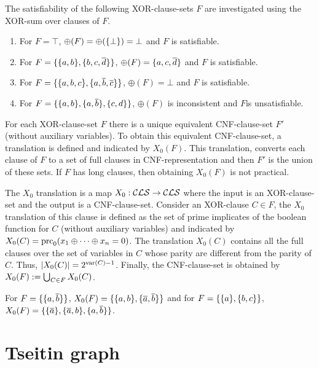 \documentclass{report}
\begin{document}
\begin{examp}\label{exp:xorcls}
The satisfiability of the following XOR-clause-sets $F$ are investigated using the XOR-sum over clauses of $F$.
  \begin{enumerate}
  \item For $F=\top$, $ \oplus(F)= \oplus(\{ \bot \})=\bot$ and $F$ is satisfiable.
  \item For $F=\{ \{ a,b \},\{ b,c,\overline d \} \}$, $ \oplus(F) = \{ a,c,\overline d \}$ and $F$ is satisfiable.
  \item For $F=\{ \{ a,b,c \},\{ a, \overline b, \overline c \} \}$, $ \oplus(F) = \bot$ and $F$ is satisfiable.  
  \item  For $F=\{ \{ a,b \},\{ a, \overline b \},\{ c,d \} \}$, $\oplus (F)$ is inconsistent and $F$is unsatisfiable.
  \end{enumerate}
\end{examp}

For each XOR-clause-set $F$ there is a unique equivalent CNF-clause-set $F'$ (without auxiliary variables). To obtain this equivalent CNF-clause-set, a translation is defined and indicated by $X_0(F)$. This translation, converts each clause of $F$ to a set of full clauses in CNF-representation and then $F'$ is the union of these sets. If $F$ has long clauses, then obtaining $X_0(F)$ is not practical.

\begin{defi}\label{def:x0tr}
\cite{h8} The $X_0$ translation is a map $X_0: \mathcal{CLS} \rightarrow \mathcal{CLS}$ where the input is an XOR-clause-set and the output is a  CNF-clause-set. Consider an XOR-clause $C \in F$, the $X_0$ translation of this clause is defined as the set of prime implicates of the boolean function for $C$ (without auxiliary variables) and indicated by $X_0(C)=\operatorname{prc}_0(x_1 \oplus \dots \oplus x_n = 0)$. The translation $X_0(C)$ contains all the full clauses over the set of variables in $C$ whose parity are different from the parity of $C$. Thus, $\lvert X_0(C) \rvert=2^{\operatorname{var}(C)-1}$. Finally, the CNF-clause-set is obtained by $X_0(F) := \bigcup_{C \in F} X_0(C)$.
\end{defi} 

\begin{examp}\label{exp:X0}
For $F=\{ \{ a,\overline b \} \}$, $X_0(F)= \{ \{ a,b \},\{ \overline a,\overline b \} \}$ and for $F=\{ \{ a \},\{ b,c \} \}$, $X_0(F)=\{ \{ \overline a \},\{ \overline a, b \}, \{ a, \overline b \} \}$.
\end{examp}
\section{Tseitin graph}
\label{sec:Tseitin graph}
\end{document}
